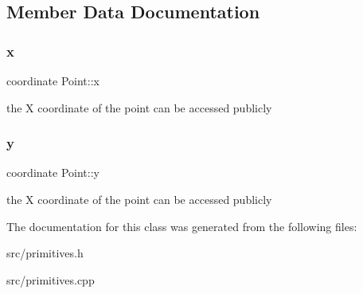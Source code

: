 \subsection{Member Data Documentation}
\mbox{\label{classPoint_a2e5bf2da8d7f35ef2ca707ae5ec1929b}} 
\subsubsection{\texorpdfstring{x}{x}}
{\footnotesize\ttfamily coordinate Point\+::x}

the X coordinate of the point can be accessed publicly \mbox{\label{classPoint_a4390d37c7ed19ad07212fc84df2fe26e}} 
\subsubsection{\texorpdfstring{y}{y}}
{\footnotesize\ttfamily coordinate Point\+::y}

the X coordinate of the point can be accessed publicly 

The documentation for this class was generated from the following files\+:\begin{DoxyCompactItemize}
\item 
src/primitives.\+h\item 
src/primitives.\+cpp\end{DoxyCompactItemize}
